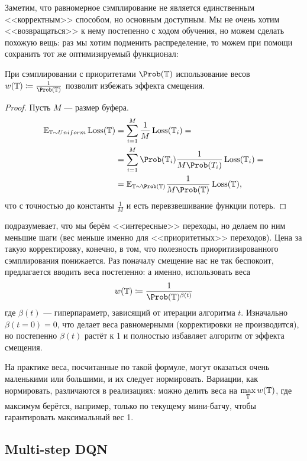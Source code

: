 Заметим, что равномерное сэмплирование не является единственным <<корректным>> способом, но основным доступным. Мы не очень хотим <<возвращаться>> к нему постепенно с ходом обучения, но можем сделать похожую вещь: раз мы хотим подменить распределение, то можем при помощи  сохранить тот же оптимизируемый функционал:

\begin{theorem}
При сэмплировании с приоритетами $\Prob( \T )$ использование весов $w(\T) \coloneqq \frac{1}{\Prob (\T )}$ позволит избежать эффекта смещения.
\begin{proof} Пусть $M$ --- размер буфера.
\begin{align*}
\mathbb{E}_{\T \sim \mathop{Uniform}} \Loss(\T ) &= \sum_{i=1}^M \frac{1}{M} \Loss(\T_i) = \\ 
&= \sum_{i=1}^M \Prob (\T_i) \frac{1}{M\Prob (T_i)} \Loss(\T_i) = \\
&= \mathbb{E}_{\T \sim \Prob (\T)} \frac{1}{M\Prob (\T )} \Loss(\T),
\end{align*}
что с точностью до константы $\frac{1}{M}$ и есть перевзвешивание функции потерь.
\end{proof}
\end{theorem}

 подразумевает, что мы берём <<интересные>> переходы, но делаем по ним меньшие шаги (вес меньше именно для <<приоритетных>> переходов). Цена за такую корректировку, конечно, в том, что полезность приоритизированного сэмплирования понижается. Раз поначалу смещение нас не так беспокоит, предлагается вводить веса постепенно: а именно, использовать веса
$$w(\T) \coloneqq \frac{1}{\Prob (\T )^{\beta(t)}}$$
где $\beta(t)$ --- гиперпараметр, зависящий от итерации алгоритма $t$. Изначально $\beta(t=0) = 0$, что делает веса равномерными (корректировки не производится), но постепенно $\beta(t)$ растёт к 1 и полностью избавляет алгоритм от эффекта смещения.

\begin{remark}
На практике веса, посчитанные по такой формуле, могут оказаться очень маленькими или большими, и их следует нормировать. Вариации, как нормировать, различаются в реализациях: можно делить веса на $\max\limits_{\mathbb{T}} w(\mathbb{T})$, где максимум берётся, например, только по текущему мини-батчу, чтобы гарантировать максимальный вес 1.
\end{remark}

\subsection{Multi-step DQN}\label{subsec:multistepdqn}

